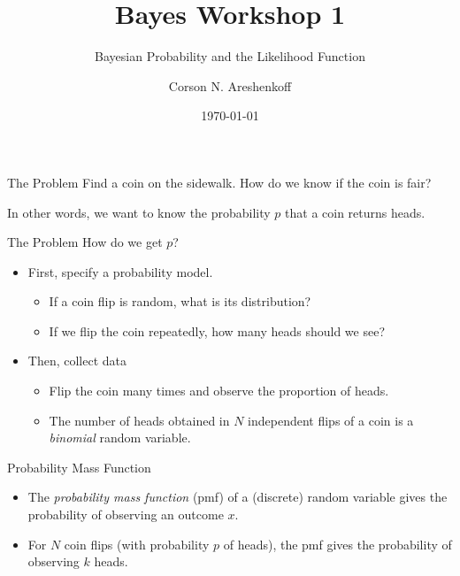 \documentclass{beamer}
\title{Bayes Workshop 1}
\subtitle{Bayesian Probability and the Likelihood Function}
\date{\today}
\author{Corson N. Areshenkoff}
\institute{University of Victoria}
\begin{document}
\maketitle

\begin{frame}{The Problem}
Find a coin on the sidewalk. How do we know if the coin is fair? \par
In other words, we want to know the probability $p$ that a coin returns heads.
\end{frame}

\begin{frame}{The Problem}
How do we get $p$?
        \begin{itemize}
                \item First, specify a probability model. 
                \begin{itemize}
                        \item If a coin flip is random, what is its distribution?
                        \item If we flip the coin repeatedly, how many heads should we see?
                \end{itemize}     
                \item Then, collect data
                \begin{itemize}
                        \item Flip the coin many times and observe the proportion of heads.
                        \item The number of heads obtained in $N$ independent flips of a coin is a \emph{binomial} random variable.
                \end{itemize}                                           
        \end{itemize}
\end{frame}

\begin{frame}{Probability Mass Function}
\begin{itemize}
        \item The \emph{probability mass function} (pmf) of a (discrete) random variable gives the probability of observing an outcome $x$.
        \item For $N$ coin flips (with probability $p$ of heads), the pmf gives the probability of observing $k$ heads.
\end{itemize}        
\end{frame}
\end{document}
